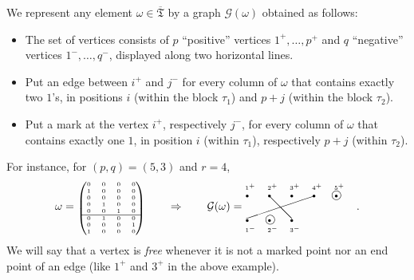 \documentclass[ALCO,Unicode]{cedram}
\newcommand{\ppermutationsof}{\mathfrak{T}}
\newcommand{\parameters}{\overline{\ppermutationsof}}
\begin{document}
We represent any element $\omega\in\parameters$ by a graph $\mathcal{G}(\omega)$ obtained as follows:
\begin{itemize}
\item
The set of vertices consists of $p$ ``positive'' vertices $1^+,\ldots,p^+$ and $q$ ``negative'' vertices $1^-,\ldots,q^-$, displayed along two horizontal lines.
\item Put an edge between $i^+$ and $j^-$ for every column of $\omega$ that contains exactly two $1$'s, in positions $i$ (within the block $\tau_1$) and $p+j$ (within the block $\tau_2$).
\item
Put a mark at the vertex $i^+$, respectively $j^-$, for every column of $\omega$ that contains exactly one $1$, in position $i$ (within $\tau_1$), respectively $p+j$ (within $\tau_2$).
\end{itemize}
For instance, for $(p,q)=(5,3)$ and $r=4$,
\begin{equation}
\label{2.1}
\omega=\mbox{\tiny $\begin{pmatrix} 0 & 0 & 0 & 0\\ 1 & 0 & 0 & 0\\ 0 & 0 & 0 & 0\\ 0 & 1 & 0 & 0\\ 0 & 0 & 1 & 0\\ \hline 0 & 1 & 0 & 0\\ 0 & 0 & 0 & 1\\ 1 & 0 & 0 & 0 \end{pmatrix}$}
\qquad
\Rightarrow
\qquad
\mathcal{G}(\omega)=
\mbox{\tiny
$\begin{picture}(100,20)(0,0)
\put(0,11){$\bullet$}\put(20,11){$\bullet$}\put(40,11){$\bullet$}\put(60,11){$\bullet$}\put(80,11){$\bullet$}
\put(0,18){$1^+$}\put(20,18){$2^+$}\put(40,18){$3^+$}\put(60,18){$4^+$}\put(80,18){$5^+$}
\put(0,-11){$\bullet$}\put(20,-11){$\bullet$}\put(40,-11){$\bullet$}
\put(0,-20){$1^-$}\put(20,-20){$2^-$}\put(40,-20){$3^-$}
\put(21,13){\line(1,-1){21}}
\put(61,12){\line(-3,-1){60}}
\put(82,13){\circle{8}}
\put(22.5,-9){\circle{8}}
\end{picture}$}.
\end{equation}
We will say that a vertex is {\em free} whenever it is not a marked
point nor an end point of an edge (like $1^+$ and $3^+$ in the above
example).
\end{document}
